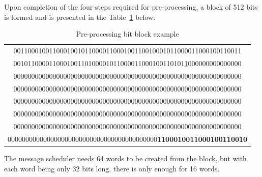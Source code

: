        Upon completion of the four steps required for pre-processing, a block of 512 bits is formed and is presented in the Table~\ref{table:Pre-processing bit block example} below:
        \begin{table}[h]
            
            \caption{Pre-processing bit block example}
            \label{table:Pre-processing bit block example}
            \begin{center}
            \begin{tabular}{|c|}
             \hline     
             0011000100110001001011000011000100110010001011000011000100110011 \\
             001011000011000100110100001011000011000100110101\underline{1}000000000000000 \\
             0000000000000000000000000000000000000000000000000000000000000000 \\
             0000000000000000000000000000000000000000000000000000000000000000 \\
             0000000000000000000000000000000000000000000000000000000000000000 \\
             0000000000000000000000000000000000000000000000000000000000000000 \\
             0000000000000000000000000000000000000000000000000000000000000000 \\
             000000000000000000000000000000000000000000\textbf{1100010011000100110010} \\
             \hline
            \end{tabular}
            \end{center}
            
        \end{table}
        
        The message scheduler needs 64 words to be created from the block, but with each word being only 32 bits long, there is only enough for 16 words. 
        
